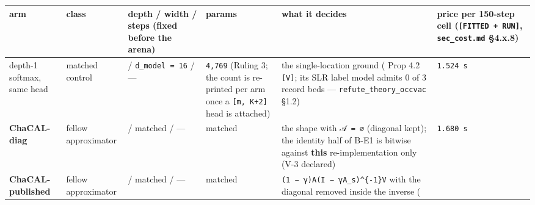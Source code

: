\documentclass[11pt,a4paper]{article}
\newcounter{none}                 %
\theoremstyle{plain}
\theoremstyle{definition}
\theoremstyle{remark}
\begin{document}
{\def\LTcaptype{none} %
\begin{longtable}[]{@{}
  >{\raggedright\arraybackslash}p{}
  >{\raggedright\arraybackslash}p{}
  >{\raggedright\arraybackslash}p{}
  >{\raggedright\arraybackslash}p{}
  >{\raggedright\arraybackslash}p{}
  >{\raggedright\arraybackslash}p{}@{}}
\toprule\noalign{}
\begin{minipage}[b]{\linewidth}\raggedright
arm
\end{minipage} & \begin{minipage}[b]{\linewidth}\raggedright
class
\end{minipage} & \begin{minipage}[b]{\linewidth}\raggedright
depth / width / steps (fixed before the arena)
\end{minipage} & \begin{minipage}[b]{\linewidth}\raggedright
params
\end{minipage} & \begin{minipage}[b]{\linewidth}\raggedright
what it decides
\end{minipage} & \begin{minipage}[b]{\linewidth}\raggedright
price per 150-step cell (\texttt{{[}FITTED\ +\ RUN{]}},
\texttt{sec\_cost.md} §4.x.8)
\end{minipage} \\
\midrule\noalign{}
\endhead
\bottomrule\noalign{}
\endlastfoot
depth-1 softmax, same head & matched control & 1 /
\texttt{d\_model\ =\ 16} / --- & \texttt{4,769} (Ruling 3; the count is
re-printed per arm once a \texttt{{[}m,\ K+2{]}} head is attached) & the
single-location ground (\citep{duranthon-2026-softmax-advantage} Prop
4.2 \texttt{{[}V{]}}; its SLR label model admits 0 of 3 record beds ---
\texttt{refute\_theory\_occvac} §1.2) & \texttt{1.524\ s} \\
\textbf{ChaCAL-diag} & fellow approximator & 1 / matched / --- & matched
& the shape with \texttt{𝒜\ =\ ∅} (diagonal kept); the identity half of
B-E1 is bitwise against \textbf{this} re-implementation only (V-3
declared) & \texttt{1.680\ s} \\
\textbf{ChaCAL-published} & fellow approximator & 1 / matched / --- &
matched & \texttt{(1\ −\ γ)A(I\ −\ γA\_s)\^{}\{-1\}V} with the diagonal
removed inside the inverse (\citep{fagnou-2024-chacal}

\end{longtable}}
\end{document}
